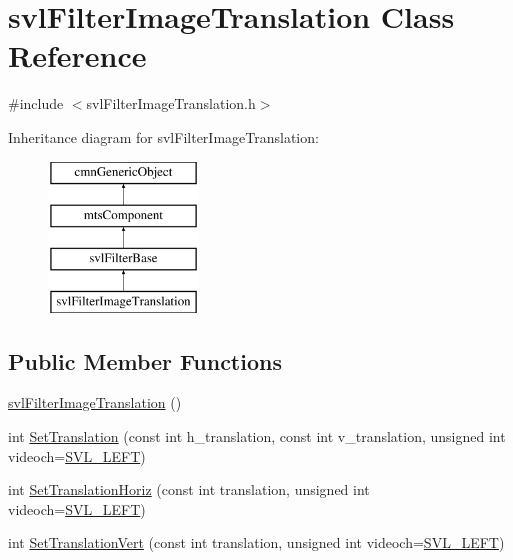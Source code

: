 \hypertarget{classsvl_filter_image_translation}{\section{svl\-Filter\-Image\-Translation Class Reference}
\label{classsvl_filter_image_translation}
}


{\ttfamily \#include $<$svl\-Filter\-Image\-Translation.\-h$>$}

Inheritance diagram for svl\-Filter\-Image\-Translation\-:\begin{figure}[H]
\begin{center}
\leavevmode
\includegraphics[height=4.000000cm]{d8/d7b/classsvl_filter_image_translation}
\end{center}
\end{figure}
\subsection*{Public Member Functions}
\begin{DoxyCompactItemize}
\item 
\hyperlink{classsvl_filter_image_translation_a7c750ac0c96ead87e84ded5cb5f93f23}{svl\-Filter\-Image\-Translation} ()
\item 
int \hyperlink{classsvl_filter_image_translation_a5f184430b6401af4f36a348563ae0d0e}{Set\-Translation} (const int h\-\_\-translation, const int v\-\_\-translation, unsigned int videoch=\hyperlink{svl_definitions_8h_ab9fec7615f19c8df2919eebcab0b187f}{S\-V\-L\-\_\-\-L\-E\-F\-T})
\item 
int \hyperlink{classsvl_filter_image_translation_ab13887cd4932675ad37c26d3218672ca}{Set\-Translation\-Horiz} (const int translation, unsigned int videoch=\hyperlink{svl_definitions_8h_ab9fec7615f19c8df2919eebcab0b187f}{S\-V\-L\-\_\-\-L\-E\-F\-T})
\item 
int \hyperlink{classsvl_filter_image_translation_ab1fce914fed5d8f4352aff4f30675020}{Set\-Translation\-Vert} (const int translation, unsigned int videoch=\hyperlink{svl_definitions_8h_ab9fec7615f19c8df2919eebcab0b187f}{S\-V\-L\-\_\-\-L\-E\-F\-T})
\end{DoxyCompactItemize}
